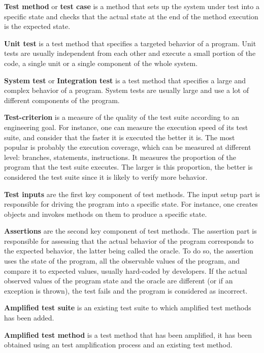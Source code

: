\textbf{Test method} or \textbf{test case} is a method that sets up the system under test into a specific state and checks that the actual state at the end of the method execution is the expected state.

\textbf{Unit test} is a test method that specifies a targeted behavior of a program. 
Unit tests are usually independent from each other and execute a small portion of the code, \ie a single unit or a single component of the whole system.

\textbf{System test} or \textbf{Integration test} is a test method that specifies a large and complex behavior of a program.
System tests are usually large and use a lot of different components of the program.

\textbf{Test-criterion} is a measure of the quality of the test suite according to an engineering goal.
For instance, one can measure the execution speed of its test suite, and consider that the faster it is executed the better it is.
The most popular is probably the execution coverage, which can be measured at different level: branches, statements, instructions.
It measures the proportion of the program that the test suite executes.
The larger is this proportion, the better is considered the test suite since it is likely to verify more behavior.

\textbf{Test inputs} are the first key component of test methods. 
The input setup part is responsible for driving the program into a specific state.
For instance, one creates objects and invokes methods on them to produce a specific state.

\textbf{Assertions} are the second key component of test methods. 
The assertion part is responsible for assessing that the actual behavior of the program corresponds to the expected behavior, the latter being called the oracle.
To do so, the assertion uses the state of the program, \ie all the observable values of the program, and compare it to expected values, usually hard-coded by developers.
If the actual observed values of the program state and the oracle are different (or if an exception is thrown), the test fails and the program is considered as incorrect.

\textbf{Amplified test suite} is an existing test suite to which amplified test methods has been added.

\textbf{Amplified test method} is a test method that has been amplified, \ie it has been obtained using an test amplification process and an existing test method.


